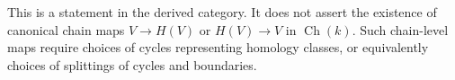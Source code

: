 This is a statement in the derived category.
It does not assert the existence of canonical chain maps \(V \to H(V)\) or \(H(V) \to V\) in \(\operatorname{Ch}(k)\).
Such chain-level maps require choices of cycles representing homology classes, or equivalently choices of splittings of cycles and boundaries.